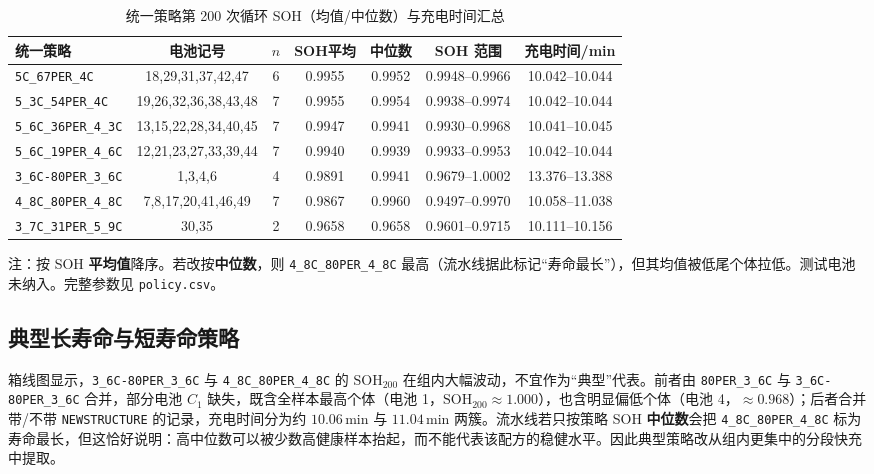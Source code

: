 \begin{table}[htbp]
\centering
\small
\caption{统一策略第 200 次循环 SOH（均值/中位数）与充电时间汇总}
\label{tab:policy_summary}
\begin{threeparttable}
\setlength{\tabcolsep}{2.8pt}
\begin{tabular}{lcccccc}
\toprule
统一策略 & 电池记号 & \(n\) & SOH平均 & 中位数 & SOH 范围 & 充电时间/min \\
\midrule
\texttt{5C\_67PER\_4C} & 18,29,31,37,42,47 & 6 & 0.9955 & 0.9952 & 0.9948--0.9966 & 10.042--10.044 \\
\texttt{5\_3C\_54PER\_4C} & 19,26,32,36,38,43,48 & 7 & 0.9955 & 0.9954 & 0.9938--0.9974 & 10.042--10.044 \\
\texttt{5\_6C\_36PER\_4\_3C} & 13,15,22,28,34,40,45 & 7 & 0.9947 & 0.9941 & 0.9930--0.9968 & 10.041--10.045 \\
\texttt{5\_6C\_19PER\_4\_6C} & 12,21,23,27,33,39,44 & 7 & 0.9940 & 0.9939 & 0.9933--0.9953 & 10.042--10.044 \\
\texttt{3\_6C-80PER\_3\_6C} & 1,3,4,6 & 4 & 0.9891 & 0.9941 & 0.9679--1.0002 & 13.376--13.388 \\
\texttt{4\_8C\_80PER\_4\_8C} & 7,8,17,20,41,46,49 & 7 & 0.9867 & 0.9960 & 0.9497--0.9970 & 10.058--11.038 \\
\texttt{3\_7C\_31PER\_5\_9C} & 30,35 & 2 & 0.9658 & 0.9658 & 0.9601--0.9715 & 10.111--10.156 \\
\bottomrule
\end{tabular}
\begin{tablenotes}
\footnotesize
\item 注：按 SOH \textbf{平均值}降序。若改按\textbf{中位数}，则 \texttt{4\_8C\_80PER\_4\_8C} 最高（流水线据此标记“寿命最长”），但其均值被低尾个体拉低。测试电池未纳入。完整参数见 \texttt{policy.csv}。
\end{tablenotes}
\end{threeparttable}
\end{table}

\subsection{典型长寿命与短寿命策略}

箱线图显示，\texttt{3\_6C-80PER\_3\_6C} 与 \texttt{4\_8C\_80PER\_4\_8C} 的 \(\mathrm{SOH}_{200}\) 在组内大幅波动，不宜作为“典型”代表。前者由 \texttt{80PER\_3\_6C} 与 \texttt{3\_6C-80PER\_3\_6C} 合并，部分电池 \(C_1\) 缺失，既含全样本最高个体（电池 1，\(\mathrm{SOH}_{200}\approx 1.000\)），也含明显偏低个体（电池 4，\(\approx 0.968\)）；后者合并带/不带 \texttt{NEWSTRUCTURE} 的记录，充电时间分为约 \(10.06\)\,min 与 \(11.04\)\,min 两簇。流水线若只按策略 SOH \textbf{中位数}会把 \texttt{4\_8C\_80PER\_4\_8C} 标为寿命最长，但这恰好说明：高中位数可以被少数高健康样本抬起，而不能代表该配方的稳健水平。因此典型策略改从组内更集中的分段快充中提取。

